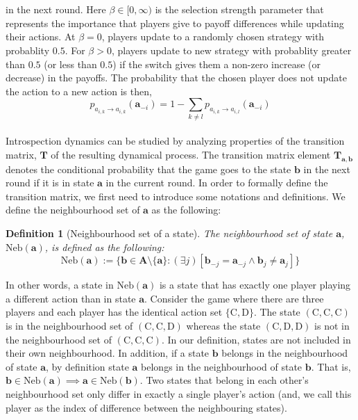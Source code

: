 \documentclass[11pt]{article}
\theoremstyle{plainCl1}
\newtheorem{definition}{Definition}
\theoremstyle{plainCl2}
\newcommand{\A}{\mathbf{A}}
\newcommand{\abf}{\mathbf{a}}
\newcommand{\bbf}{\mathbf{b}}
\newcommand{\T}{\mathbf{T}}
\newcommand{\C}{\mathrm{C}}
\newcommand{\D}{\mathrm{D}}
\begin{document}
\\ \\ \noindent in the next round. Here $\beta \in [0,\infty)$ is the selection strength parameter that represents the importance that players give to payoff differences while updating their actions. At $\beta = 0$, players update to a randomly chosen strategy with probablity $0.5$. For $\beta > 0$, players update to new strategy with probablity greater than $0.5$ (or less than $0.5$) if the switch gives them a non-zero increase (or decrease) in the payoffs. The probability that the chosen player does not update the action to a new action is then, \\
\begin{equation}
 p_{a_{i,k} \to a_{i,k}} (\abf_{-i}) = 1 - \sum_{k \neq l} p_{a_{i,k} \to a_{i,l}} (\abf_{-i})
 \label{Eq:introspection-normalization}
\end{equation}
\\ 
Introspection dynamics can be studied by analyzing properties of the transition matrix, $\T$ of the resulting dynamical process. The transition matrix element $\T_{\abf,\bbf}$ denotes the conditional probability that the game goes to the state $\bbf$ in the next round if it is in state $\abf$ in the current round. In order to formally define the transition matrix, we first need to introduce some notations and definitions. We define the neighbourhood set of $\abf$ as the following:

\begin{definition}[Neighbourhood set of a state] The neighbourhood set of state $\abf$, $\mathrm{Neb}(\abf)$, is defined as the following:
\begin{equation}
\mathrm{Neb}(\abf) := \{\bbf \in \A \setminus \{ \abf \}  : (\exists j) [ \bbf_{-j} = \abf_{-j} \land  \bbf_{j} \neq \abf_{j}] \}
\label{Eq:neighbourhood-states}
\end{equation} 
\label{Def:neighbourhood-states}
\end{definition} 
\noindent In other words, a state in $\mathrm{Neb}(\abf)$ is a state that has exactly one player playing a different action than in state $\abf$. Consider the game where there are  three players and each player has the identical action set $\{\C, \D \}$.  The state $(\C,\C,\C)$ is in the neighbourhood set of $(\C,\C,\D)$ whereas the state $(\C,\D,\D)$ is not in the neighbourhood set of $(\C,\C, \C)$. In our definition, states are not included in their own neighbourhood. In addition, if a state $\bbf$ belongs in the neighbourhood of state $\abf$, by definition state $\abf$ belongs in the neighbourhood of state $\bbf$. That is, $\bbf \in \mathrm{Neb}(\abf) \implies \abf \in \mathrm{Neb}(\bbf)$. Two states that belong in each other's neighbourhood set only differ in exactly a single player's action (and, we call this player as the index of difference between the neighbouring states).
\end{document}
